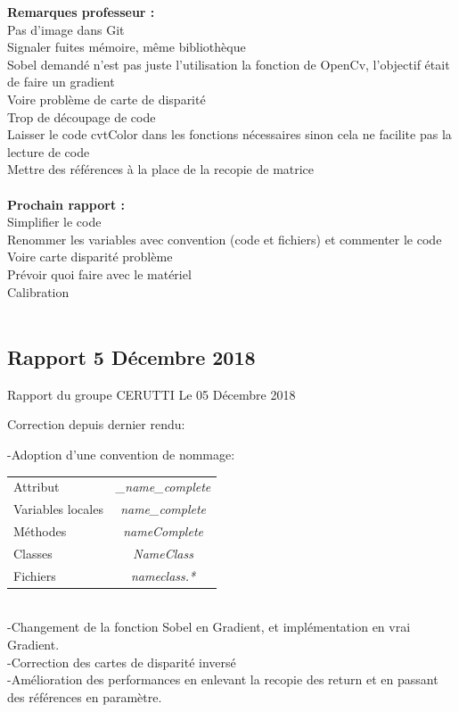 \documentclass{article}
\begin{document}
\textbf{Remarques professeur :}\\
Pas d'image dans Git\\
Signaler fuites mémoire, même bibliothèque\\
Sobel demandé n'est pas juste l'utilisation la fonction de OpenCv, l'objectif était de faire un gradient\\
Voire problème de carte de disparité\\
Trop de découpage  de code\\
Laisser le code cvtColor dans les fonctions nécessaires sinon cela ne facilite pas la lecture de code\\
Mettre des références à la place de la recopie de matrice
\\\\

\textbf{Prochain rapport :}\\
Simplifier le code\\
Renommer les variables avec convention (code et fichiers) et commenter le code\\
Voire carte disparité problème\\
Prévoir quoi faire avec le matériel\\
Calibration\\
\\

\subsection{Rapport 5 Décembre 2018}
Rapport du groupe CERUTTI
Le 05 Décembre 2018


Correction depuis dernier rendu:

    -Adoption d'une convention de nommage:\\
\begin{tabular}{ l c }
   Attribut & \textit{\_name\_complete }\\
   Variables locales  & \textit{name\_complete}\\ 
   Méthodes & \textit{nameComplete}\\
   Classes 	& \textit{NameClass}\\
   Fichiers	& \textit{nameclass.*}\\
 \end{tabular}\\
 
    -Changement de la fonction Sobel en Gradient, et implémentation en vrai Gradient.\\
    -Correction des cartes de disparité inversé\\
    -Amélioration des performances en enlevant la recopie des return et en passant des références en paramètre.\\
   
\end{document}
